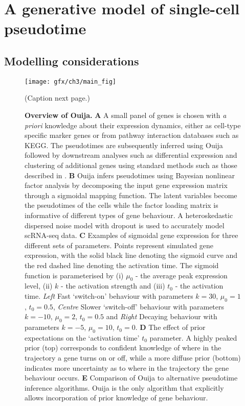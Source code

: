 \section{A generative model of single-cell pseudotime}

\subsection{Modelling considerations}

\begin{figure}%
	\centering
	\texttt{[image: gfx/ch3/main\_fig]}
  \caption{(Caption next page.)} \label{fig:main}
\end{figure}
\addtocounter{figure}{-1}
\begin{figure}
  \caption{{\bf Overview of Ouija.}
  \textbf{A} A small panel of genes is chosen with \emph{a priori} knowledge about their expression dynamics, either as cell-type specific marker genes or from pathway interaction databases such as KEGG. The pseudotimes are subsequently inferred using Ouija followed by downstream analyses such as differential expression and clustering of additional genes  using standard methods such as those described in \cite{Trapnell2014}.
  \textbf{B} Ouija infers pseudotimes using Bayesian nonlinear factor analysis by decomposing the input gene expression matrix through a sigmoidal mapping function. The latent variables become the pseudotimes of the cells while the factor loading matrix is informative of different types of gene behaviour. A heteroskedastic dispersed noise model with dropout is used to accurately model scRNA-seq data.
  \textbf{C}  Examples of sigmoidal gene expression for three different sets of parameters. Points represent simulated gene expression, with the solid black line denoting the sigmoid curve and the red dashed line denoting the activation time.
  The sigmoid function is parameterised by (i) $\mu_0$ - the average peak expression level, (ii) $k$ - the activation strength and (iii) $t_0$ - the activation time. \emph{Left} Fast `switch-on' behaviour with parameters $k= 30$, $\mu_0 = 1$, $t_0 = 0.5$, \emph{Centre} Slower `switch-off' behaviour with parameters $k= -10$, $\mu_0 = 2$, $t_0 = 0.5$ and \emph{Right} Decaying behaviour with parameters $k= -5$, $\mu_0 = 10$, $t_0 = 0$.
  \textbf{D} The effect of prior expectations on the `activation time' $t_0$ parameter. A highly peaked prior (top) corresponds to confident knowledge of where in the trajectory a gene turns on or off, while a more diffuse prior (bottom) indicates more uncertainty as to where in the trajectory the gene behaviour occurs.
  \textbf{E} Comparison of Ouija to alternative pseudotime inference algorithms. Ouija is the only algorithm that explicitly allows incorporation of prior knowledge of gene behaviour.}
\end{figure}


